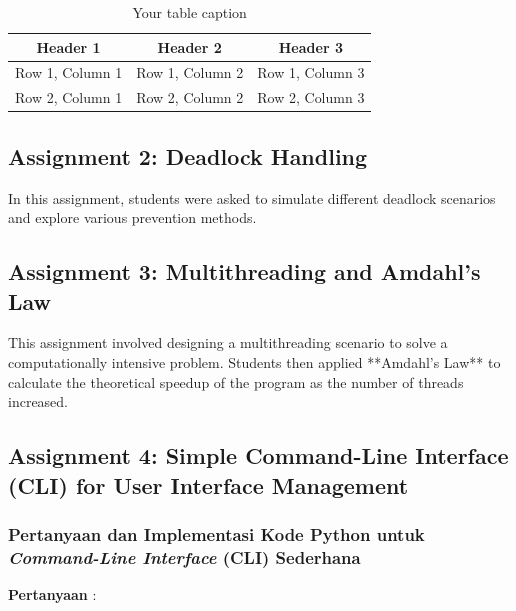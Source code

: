 \documentclass[12pt]{article}
\begin{document}
\begin{table}[htbp] %
    \centering
    \begin{tabular}{|c|c|c|} %
    \hline
    Header 1 & Header 2 & Header 3 \\ %
    \hline
    Row 1, Column 1 & Row 1, Column 2 & Row 1, Column 3 \\ %
    \hline
    Row 2, Column 1 & Row 2, Column 2 & Row 2, Column 3 \\ %
    \hline
    \end{tabular}
    \caption{Your table caption} %
    \label{tab:your_label} %
\end{table}
\subsection{Assignment 2: Deadlock Handling}
In this assignment, students were asked to simulate different deadlock scenarios and explore various prevention methods.

\subsection{Assignment 3: Multithreading and Amdahl's Law}
This assignment involved designing a multithreading scenario to solve a computationally intensive problem. Students then applied **Amdahl's Law** to calculate the theoretical speedup of the program as the number of threads increased.


\subsection{Assignment 4: Simple Command-Line Interface (CLI) for User Interface Management}

\subsubsection{Pertanyaan dan Implementasi Kode Python untuk \textit{Command-Line Interface} (CLI) Sederhana}

\textbf{Pertanyaan} :

\vspace{0.2cm}
\end{document}
